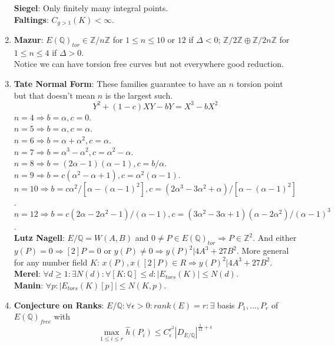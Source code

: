 \documentclass{article}
\newcommand{\Q}{\mathbb{Q}}
\newcommand{\Z}{\mathbb{Z}}
\newcommand{\Ra}{\Rightarrow}
\begin{document}
\begin{multicols}{2}
\begin{enumerate}
\textbf{Siegel}: Only finitely many integral points.\\ 

\textbf{Faltings}: $C_{g > 1}(K) < \infty$.\\ 

\item \textbf{Mazur}: $E(\Q)_{tor} \in \Z/n\Z$ for $1 \leq n \leq 10$  or $12$ if $\Delta < 0$; $\Z/2\Z \oplus \Z/2n\Z$ for $1 \leq n \leq 4$ if $\Delta > 0$.\\
Notice we can have torsion free curves but not everywhere good reduction.\\

\item \textbf{Tate Normal Form}: These families guarantee to have an $n$ torsion point but that doesn't mean $n$ is the largest such. 
\[Y^2 + (1-c)XY - bY = X^3 - bX^2\]
$n = 4 \Ra b = \alpha, c = 0$.\\
$n = 5 \Ra b = \alpha, c = \alpha$.\\
$n = 6 \Ra b = \alpha + \alpha^2, c = \alpha$.\\
$n = 7 \Ra b = \alpha^3 - \alpha^2, c = \alpha^2 - \alpha$.\\
$n = 8 \Ra b = (2\alpha-1)(\alpha-1), c = b/\alpha$.\\
$n = 9 \Ra b = c(\alpha^2 - \alpha + 1), c = \alpha^2(\alpha-1)$.\\
$n = 10 \Ra b = c\alpha^2/[\alpha - (\alpha-1)^2], c = (2\alpha^3 - 3\alpha^2 + \alpha)/[\alpha - (\alpha-1)^2]$.\\
$n = 12 \Ra b = c(2\alpha - 2\alpha^2 - 1)/(\alpha-1), c = (3\alpha^2 - 3\alpha + 1)(\alpha - 2\alpha^2)/(\alpha-1)^3$.\\

\textbf{Lutz Nagell}: $E/\Q = W(A,B)$ and $0 \neq P \in E(\Q)_{tor} \Ra P \in \Z^2$. And either $y(P) = 0 \Ra [2]P = 0$ or $y(P) \neq 0 \Ra y(P)^2|4A^3 + 27B^2$. More general for any number field $K$: $x(P),x([2]P) \in R \Ra y(P)^2|4A^3 + 27B^2$. \\

\textbf{Merel}: $\forall d \geq 1: \exists N(d): \forall [K:\Q] \leq d: |E_{tors}(K)| \leq N(d)$.\\

\textbf{Manin}: $\forall p: |E_{tors}(K)[p]| \leq N(K,p)$.

\item \textbf{Conjecture on Ranks}: $E/\Q: \forall \epsilon > 0: rank(E) = r: \exists$ basis $P_1,\ldots,P_r$ of $E(\Q)_{free}$ with 
\[\max_{1 \leq i \leq r} \hat{h}(P_i) \leq C_\epsilon^{r^2}|D_{E/\Q}|^{\frac{1}{12}+\epsilon}\]


\end{enumerate}
\end{multicols}
\end{document}
